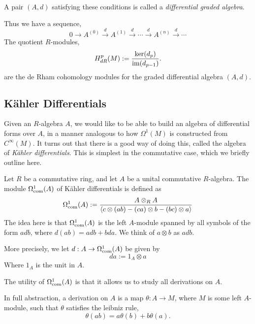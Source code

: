 \documentclass{owmaths}
\begin{document}
A pair $(A,d)$ satisfying these conditions is called a \emph{differential graded algebra}.

Thus we have a sequence,
\begin{equation*}
    0\rightarrow A^{(0)} \xrightarrow{d} A^{(1)} \xrightarrow{d} \cdots \xrightarrow{d} A^{(n)} \xrightarrow{d} \cdots
\end{equation*}
The quotient $R$-modules,
\begin{equation*}
    H^p_{dR}(M) := \frac{\ker(d_{p})}{\operatorname{im}(d_{p-1})}.
\end{equation*}
are the de Rham cohomology modules for the graded differential algebra $(A,d)$.
\subsection{K\"ahler Differentials}
Given an $R$-algebra $A$, we would like to be able to build an algebra
of differential forms over $A$, in a manner analogous to how $\Omega^1(M)$
is constructed from $C^\infty(M)$. It turns out that there is a good way of doing
this, called the algebra of \emph{K\"ahler differentials}. This is simplest in the commutative case,
which we briefly outline here.

Let $R$ be a commutative ring, and let $A$ be a unital commutative $R$-algebra. The module
$\Omega^1_{\mathrm{com}}(A)$
of K\"ahler differentials is defined as
\begin{equation*}
    \Omega^1_{\mathrm{com}}(A) := \frac{A\otimes_R A}{\langle c\otimes(ab)-(ca)\otimes b-(bc)\otimes a\rangle}
\end{equation*}
The idea here is that $\Omega^1_{\mathrm{com}}(A)$ is the left $A$-module spanned by all
symbols of the form $adb$, where $d(ab) = adb+bda$. We think of $a\otimes b$
as $adb$.

More precisely, we let $d:A\rightarrow \Omega^1_{\mathrm{com}}(A)$ be given by
\begin{equation*}
    da := 1_A\otimes a
\end{equation*}
Where $1_A$ is the unit in $A$.

The utility of $\Omega^1_{\mathrm{com}}(A)$ is that it allows us to study all
derivations on $A$. 

In full abstraction, a derivation on $A$ is a map $\theta:A\rightarrow M$, where
$M$ is some left $A$-module, such that $\theta$ satisfies the leibniz rule,
\begin{equation*}
    \theta(ab) = a\theta(b)+b\theta(a).
\end{equation*}
\end{document}
